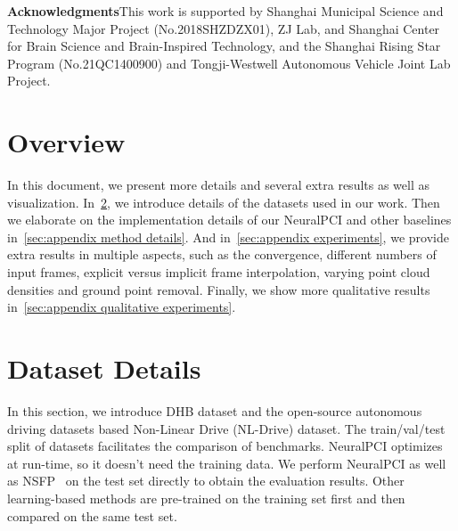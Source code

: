 \documentclass[10pt,twocolumn,letterpaper]{article}
\begin{document}
\vspace{0.1cm}
\noindent
\textbf{Acknowledgments\quad}This work is supported by Shanghai Municipal Science and Technology Major Project (No.2018SHZDZX01), ZJ Lab, and Shanghai Center for Brain Science and Brain-Inspired Technology, and the Shanghai Rising Star Program (No.21QC1400900) and Tongji-Westwell Autonomous Vehicle Joint Lab Project.
\noindent








\newlength{\bibitemsep}\setlength{\bibitemsep}{.1\baselineskip}
\newlength{\bibparskip}\setlength{\bibparskip}{0pt}
\let\oldthebibliography\thebibliography
\renewcommand\thebibliography[1]{\oldthebibliography{#1}\setlength{\parskip}{\bibitemsep}\setlength{\itemsep}{\bibparskip}}

{\small


}






\appendix
\renewcommand{\appendixname}{\appendixname~\Alph{section}}
\renewcommand*{\thefigure}{S\arabic{figure}}
\renewcommand*{\thetable}{S\arabic{table}}

\section{Overview}
In this document, we present more details and several extra results as well as visualization. In~\cref{sec:appendix dateset details}, we introduce details of the datasets used in our work. Then we elaborate on the implementation details of our NeuralPCI and other baselines in~\cref{sec:appendix method details}. And in~\cref{sec:appendix experiments}, we provide extra results in multiple aspects, such as the convergence, different numbers of input frames, explicit versus implicit frame interpolation, varying point cloud densities and ground point removal. Finally, we show more qualitative results in~\cref{sec:appendix qualitative experiments}. 





\section{Dataset Details}
\label{sec:appendix dateset details}
In this section, we introduce DHB dataset and the open-source autonomous driving datasets based Non-Linear Drive (NL-Drive) dataset. The train/val/test split of datasets facilitates the comparison of benchmarks. NeuralPCI optimizes at run-time, so it doesn’t need the training data. We perform NeuralPCI as well as NSFP~\cite{li2021neuralSF} on the test set directly to obtain the evaluation results. Other learning-based methods are pre-trained on the training set first and then compared on the same test set. 
\end{document}
